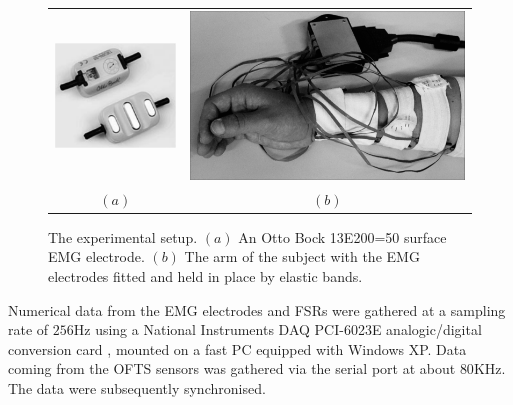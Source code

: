 \begin{figure} \centering
  \begin{tabular}{cc}
    \includegraphics[height=0.12\textheight]{figs/ottobock} &
    \includegraphics[height=0.12\textheight]{figs/setup} \\
    $(a)$ & $(b)$\\
  \end{tabular}
  \caption{The experimental setup. $(a)$ An Otto Bock 13E200=50
    surface EMG electrode. $(b)$
    The arm of the subject with the EMG electrodes fitted and held in
    place by elastic bands.}
  \label{fig:setup}
\end{figure}

Numerical data from the EMG electrodes and FSRs were gathered at a
sampling rate of $256$Hz using a National Instruments DAQ PCI-6023E
analogic/digital conversion card \cite{nidaq}, mounted on a fast PC
equipped with Windows XP. Data coming from the OFTS sensors was
gathered via the serial port at about $80$KHz. The data were
subsequently synchronised.

